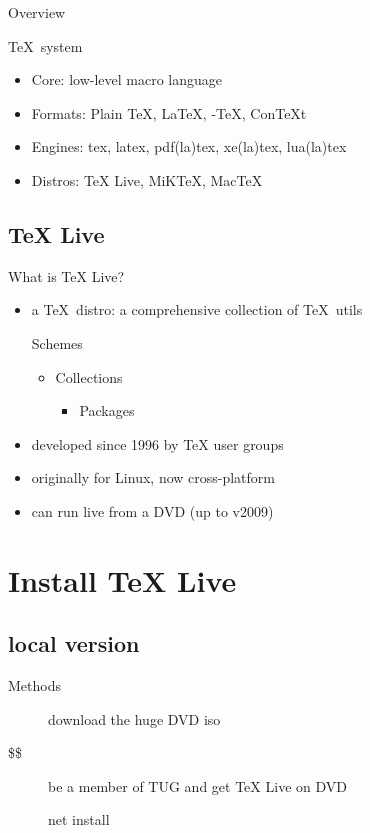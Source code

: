 \documentclass{beamer}
\def\TeXLive{\TeX{} Live\xspace}
\let\TL=\TeXLive
\begin{document}
\begin{frame}{Overview}
  \begin{block}{\TeX\ system}
    \begin{itemize}
      \item Core: low-level macro language
      \item Formats: Plain \TeX, \alert{\LaTeX}, \AmS-\TeX, Con\TeX{}t
      \item Engines: tex, latex, pdf(la)tex, \alert{xe(la)tex}, lua(la)tex
      \item Distros: \TL, MiK\TeX, Mac\TeX
    \end{itemize}
  \end{block}
\end{frame}

\subsection{\TeXLive}

\begin{frame}{What is \TL ?}
  \begin{itemize}
    \item a \TeX\ distro: a comprehensive collection of \TeX\ utils

      Schemes
      \begin{itemize}
        \item Collections
          \begin{itemize}
            \item Packages
          \end{itemize}
      \end{itemize}

    \item developed since 1996 by TeX user groups
    \item originally for Linux, now cross-platform
    \item can run live from a DVD (up to v2009)
  \end{itemize}
\end{frame}

\section{Install \TL}
\subsection{local version}
\begin{frame}{Methods}
  \begin{description}
    \item[\frownie] download the huge DVD iso
      \pause
    \item[\$\$] be a member of TUG and get \TL on DVD
      \pause
    \item[\smiley] net install
  \end{description}
\end{frame}
\end{document}
